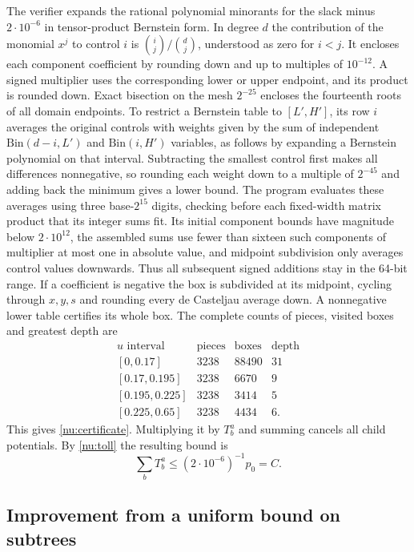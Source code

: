 \documentclass[11pt]{article}
\numberwithin{equation}{section}
\begin{document}
The verifier expands the rational polynomial minorants for the
slack minus $2\cdot10^{-6}$ in tensor-product Bernstein form.
In degree $d$ the contribution of the monomial $x^j$ to control
$i$ is $\binom{i}{j}/\binom{d}{j}$, understood as zero for
$i<j$. It encloses each component coefficient by rounding
down and up to multiples of $10^{-12}$. A signed multiplier uses
the corresponding lower or upper endpoint, and its product is
rounded down. Exact bisection on the mesh $2^{-25}$ encloses the
fourteenth roots of all domain endpoints. To restrict a Bernstein
table to $[L',H']$, its row $i$ averages the original controls
with weights given by the sum of independent
$\mathrm{Bin}(d-i,L')$ and $\mathrm{Bin}(i,H')$ variables,
as follows by expanding a Bernstein polynomial on that interval.
Subtracting the smallest control first makes all differences
nonnegative, so rounding each weight down to a multiple of
$2^{-45}$ and adding back the minimum gives a lower bound.
The program evaluates these averages using three base-$2^{15}$
digits, checking before each fixed-width matrix product that its
integer sums fit. Its initial component bounds have magnitude
below $2\cdot10^{12}$, the assembled sums use fewer than sixteen
such components of multiplier at most one in absolute value, and
midpoint subdivision only averages control values downwards.
Thus all subsequent signed additions stay in the 64-bit range.
If a coefficient is negative the box is subdivided at its midpoint,
cycling through $x,y,s$ and rounding every de Casteljau average
down. A nonnegative lower table certifies its whole box. The
complete counts of pieces, visited boxes and greatest depth are
\[
 \begin{array}{c|rrr}
 u\text{ interval}&\text{pieces}&\text{boxes}&\text{depth}\\ \hline
 {[0,0.17]}&3238&88490&31\\
 {[0.17,0.195]}&3238&6670&9\\
 {[0.195,0.225]}&3238&3414&5\\
 {[0.225,0.65]}&3238&4434&6 .
 \end{array}
\]
This gives \eqref{nu:certificate}. Multiplying it by $T_b^a$
and summing cancels all child potentials. By \eqref{nu:toll}
the resulting bound is
\[
 \sum_b T_b^a\le (2\cdot10^{-6})^{-1}p_0=C .
\]

\subsection{Improvement from a uniform bound on subtrees}
\end{document}
